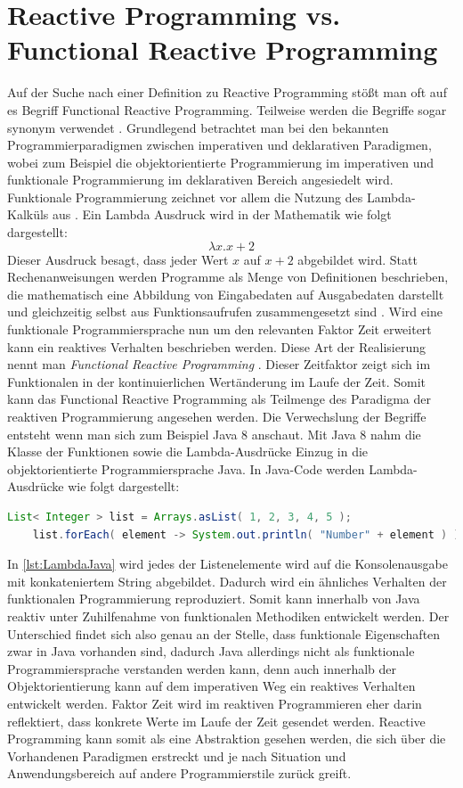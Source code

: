 \section{Reactive Programming vs. Functional Reactive Programming}
Auf der Suche nach einer Definition zu Reactive Programming stößt man oft auf es Begriff Functional Reactive Programming. Teilweise werden die Begriffe sogar synonym verwendet \cite{Nurkiewicz.2017}. Grundlegend betrachtet man bei den bekannten Programmierparadigmen zwischen imperativen und deklarativen Paradigmen, wobei zum Beispiel die objektorientierte Programmierung im imperativen und funktionale Programmierung im deklarativen Bereich angesiedelt wird. Funktionale Programmierung zeichnet vor allem die Nutzung des Lambda-Kalküls aus \cite{lamdakalk}. Ein Lambda Ausdruck wird in der Mathematik wie folgt dargestellt:
\begin{displaymath}
	\lambda x.x+2
\end{displaymath}
Dieser Ausdruck besagt, dass jeder Wert $x$ auf $x+2$ abgebildet wird.
 Statt Rechenanweisungen werden Programme als Menge von Definitionen beschrieben, die mathematisch eine Abbildung von Eingabedaten auf Ausgabedaten darstellt und gleichzeitig selbst aus Funktionsaufrufen zusammengesetzt sind \cite{fpwiki}. Wird eine funktionale Programmiersprache nun um den relevanten Faktor Zeit erweitert kann ein reaktives Verhalten beschrieben werden. Diese Art der Realisierung nennt man \textit{Functional Reactive Programming} \cite{hsklwiki}. Dieser Zeitfaktor zeigt sich im Funktionalen in der kontinuierlichen Wertänderung im Laufe der Zeit. Somit kann das Functional Reactive Programming als Teilmenge des Paradigma der reaktiven Programmierung angesehen werden. Die Verwechslung der Begriffe entsteht wenn man sich zum Beispiel Java 8 anschaut. Mit Java 8 nahm die Klasse der Funktionen sowie die Lambda-Ausdrücke Einzug in die objektorientierte Programmiersprache Java. In Java-Code werden Lambda-Ausdrücke wie folgt dargestellt:
 \begin{lstlisting}[language=java, caption={Lambda Beispiel in Java}, label=lst:LambdaJava, frame=single]
 	List< Integer > list = Arrays.asList( 1, 2, 3, 4, 5 );
 	list.forEach( element -> System.out.println( "Number" + element ) );
 	 \end{lstlisting}
In \ref{lst:LambdaJava} wird jedes der Listenelemente wird auf die Konsolenausgabe mit konkateniertem String abgebildet. Dadurch wird ein ähnliches Verhalten der funktionalen Programmierung reproduziert. Somit kann innerhalb von Java reaktiv unter Zuhilfenahme von funktionalen Methodiken entwickelt werden. Der Unterschied findet sich also genau an der Stelle, dass funktionale Eigenschaften zwar in Java vorhanden sind, dadurch Java allerdings nicht als funktionale Programmiersprache verstanden werden kann, denn auch innerhalb der Objektorientierung kann auf dem imperativen Weg ein reaktives Verhalten entwickelt werden. Faktor Zeit wird im reaktiven Programmieren eher darin reflektiert, dass konkrete Werte im Laufe der Zeit gesendet werden. Reactive Programming kann somit als eine Abstraktion gesehen werden, die sich über die Vorhandenen Paradigmen erstreckt und je nach Situation und Anwendungsbereich auf andere Programmierstile zurück greift. 

